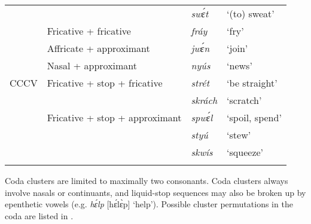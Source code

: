 \begin{table}
\begin{tabularx}{\textwidth}{lX lX}
&  & \itshape swɛ́t & ‘(to) sweat’\\
& Fricative + fricative & \itshape fráy & ‘fry’\\
& Affricate + approximant & \itshape jwɛ́n & ‘join’\\
& Nasal + approximant & \itshape nyús & ‘news’\\
CCCV & Fricative + stop + fricative & \itshape strét & ‘be straight’\\
&  & \itshape skrách & ‘scratch’\\
& Fricative + stop + approximant & \itshape spwɛ́l & ‘spoil, spend’\\
&  & \itshape styú & ‘stew’\\
&  & \itshape skwís & ‘squeeze’\\
\lspbottomrule
\end{tabularx}
\end{table}
Coda clusters are limited to maximally two consonants. Coda clusters always involve nasals or continuants, and liquid-stop sequences may also be broken up by epenthetic vowels (e.g. \textit{hɛ́lp} [hɛ́lɛ̀p] ‘help’). Possible cluster permutations in the coda are listed in . {\fff}

